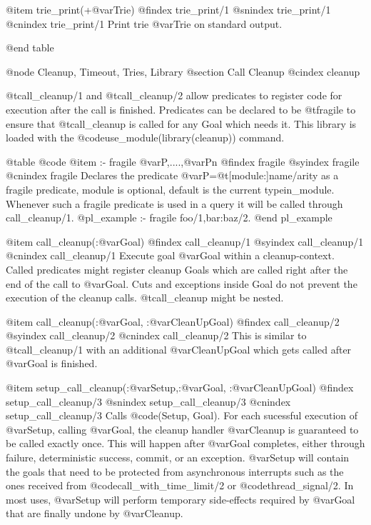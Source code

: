 @item trie_print(+@var{Trie})
@findex trie_print/1
@snindex trie_print/1
@cnindex trie_print/1
Print trie @var{Trie} on standard output.




@end table


@node Cleanup, Timeout, Tries, Library
@section Call Cleanup
@cindex cleanup

@t{call_cleanup/1} and @t{call_cleanup/2} allow predicates to register
code for execution after the call is finished. Predicates can be
declared to be @t{fragile} to ensure that @t{call_cleanup} is called
for any Goal which needs it. This library is loaded with the
@code{use_module(library(cleanup))} command.

@table @code
@item :- fragile @var{P},....,@var{Pn}
@findex fragile
@syindex fragile
@cnindex fragile
Declares the predicate @var{P}=@t{[module:]name/arity} as a fragile
predicate, module is optional, default is the current
typein_module. Whenever such a fragile predicate is used in a query
it will be called through call_cleanup/1.
@pl_example
:- fragile foo/1,bar:baz/2.
@end pl_example

@item call_cleanup(:@var{Goal})
@findex call_cleanup/1
@syindex call_cleanup/1
@cnindex call_cleanup/1
Execute goal @var{Goal} within a cleanup-context. Called predicates
might register cleanup Goals which are called right after the end of
the call to @var{Goal}. Cuts and exceptions inside Goal do not prevent the
execution of the cleanup calls. @t{call_cleanup} might be nested.

@item call_cleanup(:@var{Goal}, :@var{CleanUpGoal})
@findex call_cleanup/2
@syindex call_cleanup/2
@cnindex call_cleanup/2
This is similar to @t{call_cleanup/1} with an additional
@var{CleanUpGoal} which gets called after @var{Goal} is finished.

@item setup_call_cleanup(:@var{Setup},:@var{Goal}, :@var{CleanUpGoal})
@findex setup_call_cleanup/3
@snindex setup_call_cleanup/3
@cnindex setup_call_cleanup/3
Calls @code{(Setup, Goal)}. For each sucessful execution of @var{Setup}, calling @var{Goal}, the
cleanup handler @var{Cleanup} is guaranteed to be called exactly once.
This will happen after @var{Goal} completes, either through failure,
deterministic success, commit, or an exception.  @var{Setup} will
contain the goals that need to be protected from asynchronous interrupts
such as the ones received from @code{call_with_time_limit/2} or @code{thread_signal/2}.  In
most uses, @var{Setup} will perform temporary side-effects required by
@var{Goal} that are finally undone by @var{Cleanup}.

